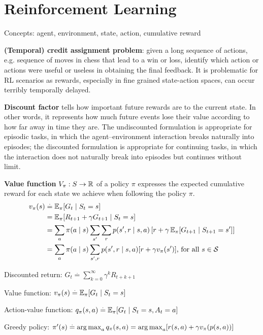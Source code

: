 \documentclass[12pt]{article}
\begin{document}
\section{Reinforcement Learning}
Concepts: agent, environment, state, action, cumulative reward
\par \textbf{(Temporal) credit assignment problem}: given a long sequence of actions, e.g. sequence of moves in chess that lead to a win or loss, identify which action or actions were useful or useless in obtaining the final feedback. It is problematic for RL scenarios as rewards, especially in fine grained state-action spaces, can occur terribly temporally delayed.
\par \textbf{Discount factor} tells how important future rewards are to the current state. In other words, it represents how much future events lose their value according to how far away in time they are. The undiscounted formulation is appropriate for episodic tasks, in which the agent–environment interaction breaks naturally into episodes; the discounted formulation is appropriate for continuing tasks, in which the interaction does not naturally break into episodes but continues without limit.
\par \textbf{Value function} $V_{\pi}: S\rightarrow \mathbb{R}$ of a policy $\pi$ expresses the expected cumulative reward for each state we achieve when following the policy $\pi$.
\begin{equation*}
\begin{split}
v_{\pi} (s) &\stackrel{.}{=} \operatorname{\mathbb{E}}_{\pi} [G_t \mid S_t = s] \\
&= \operatorname{\mathbb{E}}_{\pi} [R_{t+1} + \gamma G_{t+1} \mid S_t = s] \\
&= \sum_a \pi (a\mid s) \sum_{s'} \sum_r p(s',r \mid s,a)
\left[r + \gamma\operatorname{\mathbb{E}}_{\pi}[G_{t+1}\mid S_{t+1} = s']\right]\\
&= \sum_a \pi (a\mid s) \sum_{s',r} p(s',r\mid s,a) [r+\gamma v_{\pi}(s')] \text{, for all } s\in\mathcal{S}
\end{split}
\end{equation*}
\ulb
\item Discounted return: $G_t \stackrel{.}{=} \sum_{k=0}^{\infty} \gamma^k R_{t+k+1} $
\item Value function: $v_{\pi} (s) \stackrel{.}{=} \operatorname{\mathbb{E}}_{\pi} [G_t \mid S_t = s]$
\item Action-value function: $q_{\pi} (s,a) \stackrel{.}{=} \operatorname{\mathbb{E}}_{\pi} [G_t \mid S_t = s, A_t = a]$
\item Greedy policy: $\pi' (s) \stackrel{.}{=} \operatorname*{arg\,max}_a q_{\pi}(s,a) = \operatorname*{arg\,max}_a [r(s,a) + \gamma v_{\pi}(p(s,a))]$
\ule
\end{document}
